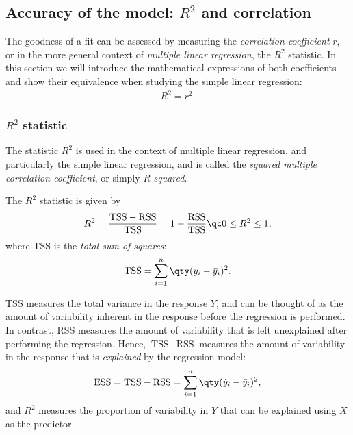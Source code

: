 \subsection{Accuracy of the model: \texorpdfstring{$R^{2}$}{R-squared} and correlation}
The goodness of a fit can be assessed by measuring the \emph{correlation coefficient} $r$, or in the more general context of \emph{multiple linear regression}, the $R^{2}$ statistic. In this section we will introduce the mathematical expressions of both coefficients and show their equivalence when studying the simple linear regression:
\begin{align}\label{eq:R2-r2}
	R^{2} = r^{2}.
\end{align}

\subsubsection{\texorpdfstring{$R^{2}$}{R-squared} statistic}
The statistic $R^{2}$ is used in the context of multiple linear regression, and particularly the simple linear regression, and is called the \emph{squared multiple correlation coefficient}, or simply \emph{R-squared}.

\bigskip
The $R^{2}$ statistic is given by
\begin{align}
	R^{2} %
	 	  = \frac{\text{TSS} - \text{RSS}}{\text{TSS}}
		  = 1 - \frac{\text{RSS}}{\text{TSS}}
	\qc 0 \leq R^{2} \leq 1,
\end{align}
where TSS is the \emph{total sum of squares}:
\begin{align}
	\text{TSS} = \sum_{i=1}^{n} \qty(y_{i} - \bar{y}_{i})^{2}.
\end{align}

TSS measures the total variance in the response $Y$, and can be thought of as the amount of variability inherent in the response before the regression is performed. In contrast, RSS measures the amount of variability that is left unexplained after performing the regression. Hence, $\text{TSS} - \text{RSS}$ measures the amount of variability in the response that is \emph{explained} by the regression model:
\begin{align}
	\text{ESS} = \text{TSS} - \text{RSS} = \sum_{i=1}^{n} \qty(\hat{y}_{i} - \bar{y}_{i})^{2},
\end{align}
and $R^{2}$ measures the proportion of variability in $Y$ that can be explained using $X$ as the predictor.

